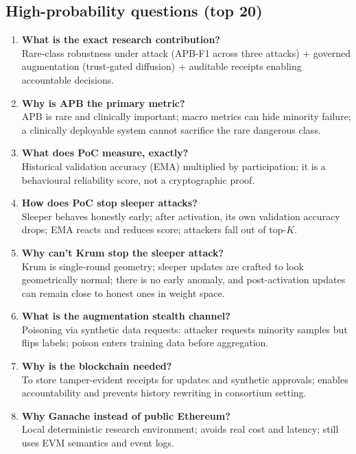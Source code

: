 \documentclass[11pt,a4paper]{article}
\begin{document}
\subsection{High-probability questions (top 20)}
\begin{enumerate}
\item \textbf{What is the exact research contribution?}\\
Rare-class robustness under attack (APB-F1 across three attacks) + governed augmentation (trust-gated diffusion) + auditable receipts enabling accountable decisions.

\item \textbf{Why is APB the primary metric?}\\
APB is rare and clinically important; macro metrics can hide minority failure; a clinically deployable system cannot sacrifice the rare dangerous class.

\item \textbf{What does PoC measure, exactly?}\\
Historical validation accuracy (EMA) multiplied by participation; it is a behavioural reliability score, not a cryptographic proof.

\item \textbf{How does PoC stop sleeper attacks?}\\
Sleeper behaves honestly early; after activation, its own validation accuracy drops; EMA reacts and reduces score; attackers fall out of top-$K$.

\item \textbf{Why can’t Krum stop the sleeper attack?}\\
Krum is single-round geometry; sleeper updates are crafted to look geometrically normal; there is no early anomaly, and post-activation updates can remain close to honest ones in weight space.

\item \textbf{What is the augmentation stealth channel?}\\
Poisoning via synthetic data requests: attacker requests minority samples but flips labels; poison enters training data before aggregation.

\item \textbf{Why is the blockchain needed?}\\
To store tamper-evident receipts for updates and synthetic approvals; enables accountability and prevents history rewriting in consortium setting.

\item \textbf{Why Ganache instead of public Ethereum?}\\
Local deterministic research environment; avoids real cost and latency; still uses EVM semantics and event logs.


\end{enumerate}
\end{document}
